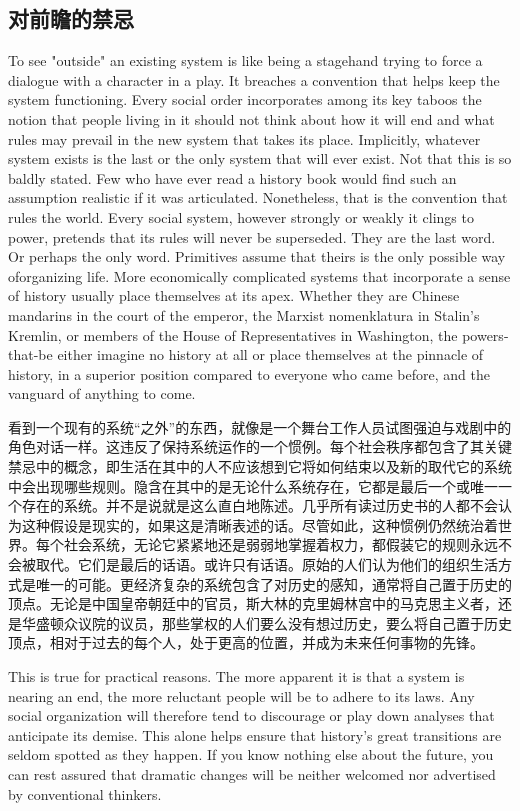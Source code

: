 \subsection{对前瞻的禁忌}
\begin{paracol}{2}
To see "outside" an existing system is like being a stagehand trying to force a dialogue with a character in a play. It breaches a convention that helps keep the system functioning. Every social order incorporates among its key taboos the notion that people living in it should not think about how it will end and what rules may prevail in the new system that takes its place. Implicitly, whatever system exists is the last or the only system that will ever exist. Not that this is so baldly stated. Few who have ever read a history book would find such an assumption realistic if it was articulated. Nonetheless, that is the convention that rules the world. Every social system, however strongly or weakly it clings to power, pretends that its rules will never be superseded. They are the last word. Or perhaps the only word. Primitives assume that theirs is the only possible way oforganizing life. More economically complicated systems that incorporate a sense of history usually place themselves at its apex. Whether they are Chinese mandarins in the court of the emperor, the Marxist nomenklatura in Stalin's Kremlin, or members of the House of Representatives in Washington, the powers-that-be either imagine no history at all or place themselves at the pinnacle of history, in a superior position compared to everyone who came before, and the vanguard of anything to come.  

\switchcolumn
看到一个现有的系统“之外”的东西，就像是一个舞台工作人员试图强迫与戏剧中的角色对话一样。这违反了保持系统运作的一个惯例。每个社会秩序都包含了其关键禁忌中的概念，即生活在其中的人不应该想到它将如何结束以及新的取代它的系统中会出现哪些规则。隐含在其中的是无论什么系统存在，它都是最后一个或唯一一个存在的系统。并不是说就是这么直白地陈述。几乎所有读过历史书的人都不会认为这种假设是现实的，如果这是清晰表述的话。尽管如此，这种惯例仍然统治着世界。每个社会系统，无论它紧紧地还是弱弱地掌握着权力，都假装它的规则永远不会被取代。它们是最后的话语。或许只有话语。原始的人们认为他们的组织生活方式是唯一的可能。更经济复杂的系统包含了对历史的感知，通常将自己置于历史的顶点。无论是中国皇帝朝廷中的官员，斯大林的克里姆林宫中的马克思主义者，还是华盛顿众议院的议员，那些掌权的人们要么没有想过历史，要么将自己置于历史顶点，相对于过去的每个人，处于更高的位置，并成为未来任何事物的先锋。


\switchcolumn*
This is true for practical reasons. The more apparent it is that a system is nearing an end, the more reluctant people will be to adhere to its laws. Any social organization will therefore tend to discourage or play down analyses that anticipate its demise. This alone helps ensure that history's great transitions are seldom spotted as they happen. If you know nothing else about the future, you can rest assured that dramatic changes will be neither welcomed nor advertised by conventional thinkers.


\end{paracol}
